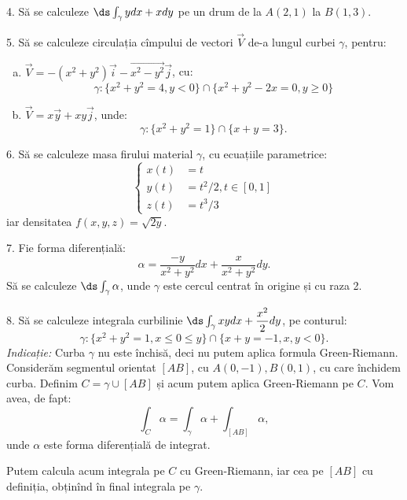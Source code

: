 \vspace{1cm}

4. Să se calculeze $ \ds\int_\gamma ydx + xdy $ pe un drum de la $ A(2, 1) $
la $ B(1, 3) $.

\vspace{1cm}

5. Să se calculeze circulația cîmpului de vectori $ \vec{V} $ de-a lungul curbei
$ \gamma $, pentru:
\begin{enumerate}[(a)]
\item $ \vec{V} = -(x^2 + y^2) \vec{i} - \vec{x^2 - y^2} \vec{j} $, cu:
  \[
    \gamma: \{ x^2 + y^2 = 4, y < 0 \} \cap \{ x^2 + y^2 - 2x = 0, y \geq 0 \}
  \]
\item $ \vec{V} = x\vec{y} + xy \vec{j} $, unde:
  \[
    \gamma: \{ x^2 + y^2 = 1 \} \cap \{ x + y = 3 \}.
  \]
\end{enumerate}

\vspace{1cm}

6. Să se calculeze masa firului material $ \gamma $, cu ecuațiile parametrice:
\[
  \begin{cases}
    x(t) &= t \\
    y(t) &= t^2/2, t \in [0, 1] \\
    z(t) &= t^3/3
  \end{cases}
\]
iar densitatea $ f(x, y, z) = \sqrt{2y} $.

\vspace{1cm}

7. Fie forma diferențială:
\[
  \alpha = \dfrac{-y}{x^2 + y^2} dx + \dfrac{x}{x^2 + y^2} dy.
\]
Să se calculeze $ \ds\int_\gamma \alpha $, unde $ \gamma $ este cercul centrat
în origine și cu raza 2.

\vspace{1cm}

8. Să se calculeze integrala curbilinie $ \ds\int_\gamma xydx + \dfrac{x^2}{2} dy $,
pe conturul:
\[
  \gamma : \{ x^2 + y^2 = 1, x \leq 0 \leq y \} \cap \{ x + y = -1, x, y < 0 \}.
\]
\emph{Indicație:} Curba $ \gamma $ nu este închisă, deci nu putem aplica
formula Green-Riemann. Considerăm segmentul orientat $ [AB] $, cu
$ A(0, -1), B(0, 1) $, cu care închidem curba. Definim $ C = \gamma \cup [AB] $
și acum putem aplica Green-Riemann pe $ C $. Vom avea, de fapt:
\[
  \int_C \alpha = \int_\gamma \alpha + \int_{[AB]} \alpha,
\]
unde $ \alpha $ este forma diferențială de integrat.

Putem calcula acum integrala pe $ C $ cu Green-Riemann, iar cea pe $ [AB] $ cu
definiția, obținînd în final integrala pe $ \gamma $.

